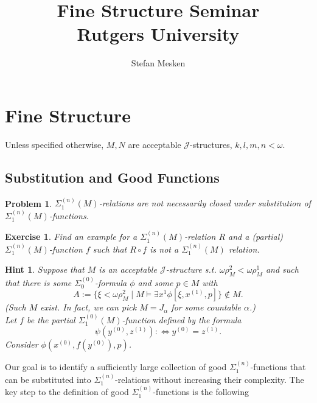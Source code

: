\documentclass[12pt,a4paper]{article}
\theoremstyle{nicestyle}
\newtheorem{problem}{Problem}[subsection]
\newtheorem{hint}{Hint}[subsection]
\newtheorem{exercise}{Exercise}[subsection]
\begin{document}
\author{Stefan Mesken}
\title{Fine Structure Seminar \\
Rutgers University}
\maketitle

\setcounter{section}{0}
\section{Fine Structure}

Unless specified otherwise, $M,N$ are acceptable
$\mathcal{J}$-structures, $k,l,m,n < \omega$.

\setcounter{subsection}{7}
\subsection{Substitution and Good Functions}


\begin{problem}
  $\Sigma^{(n)}_1(M)$-relations are not necessarily closed under
  substitution of $\Sigma^{(n)}_1(M)$-functions.
\end{problem}

\begin{exercise}
  Find an example for a $\Sigma^{(n)}_1(M)$-relation $R$ and a
  (partial) $\Sigma^{(n)}_1(M)$-function $f$ such that $R \circ f$ is
  not a $\Sigma^{(n)}_1(M)$ relation.
\end{exercise}

\begin{hint}
  Suppose that $M$ is an acceptable $\mathcal{J}$-structure
  s.t. $\omega \rho^2_M < \omega \rho^1_M$ and such that there is some
  $\Sigma^{(0)}_0$-formula $\phi$ and some $p \in M$ with
  \[
    A := \{ \xi < \omega \rho^2_M \mid M \models \exists x^1 \phi [
    \xi, x^{(1)}, p ] \} \not \in M.
  \]
  (Such $M$ exist. In fact, we can pick $M = J_{\alpha}$ for some countable $\alpha$.) \\
  Let $f$ be the partial $\Sigma^{(0)}_1(M)$-function defined by the
  formula
  \[
    \psi(y^{(0)}, z^{(1)}) : \iff y^{(0)} = z^{(1)}.
  \]
 Consider $\phi(x^{(0)}, f(y^{(0)}), p)$.
\end{hint}

Our goal is to identify a sufficiently large collection of good
$\Sigma^{(n)}_1$-functions that can be substituted into
$\Sigma^{(n)}_1$-relations without increasing their complexity. The
key step to the definition of good $\Sigma^{(n)}_{1}$-functions is the
following
\end{document}
